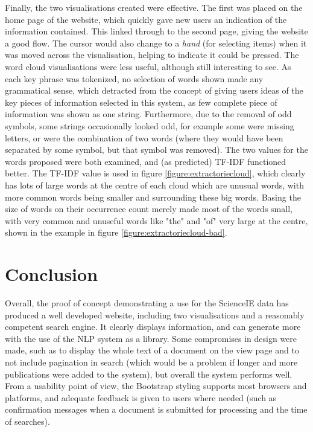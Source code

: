 Finally, the two visualisations created were effective. The first was placed on the home page of the website, which quickly gave new users an indication of the information contained. This linked through to the second page, giving the website a good flow. The cursor would also change to a \textit{hand} (for selecting items) when it was moved across the visualisation, helping to indicate it could be pressed. The word cloud visualisations were less useful, although still interesting to see. As each key phrase was tokenized, no selection of words shown made any grammatical sense, which detracted from the concept of giving users ideas of the key pieces of information selected in this system, as few complete piece of information was shown as one string. Furthermore, due to the removal of odd symbols, some strings occasionally looked odd, for example some were missing letters, or were the combination of two words (where they would have been separated by some symbol, but that symbol was removed). The two values for the words proposed were both examined, and (as predicted) TF-IDF functioned better. The TF-IDF value is used in figure \ref{figure:extractoriecloud}, which clearly has lots of large words at the centre of each cloud which are unusual words, with more common words being smaller and surrounding these big words. Basing the size of words on their occurrence count merely made most of the words small, with very common and unuseful words like "the" and "of" very large at the centre, shown in the example in figure \ref{figure:extractoriecloud-bad}.

\section{Conclusion}
Overall, the proof of concept demonstrating a use for the ScienceIE data has produced a well developed website, including two visualisations and a reasonably competent search engine. It clearly displays information, and can generate more with the use of the NLP system as a library. Some compromises in design were made, such as to display the whole text of a document on the view page and to not include pagination in search (which would be a problem if longer and more publications were added to the system), but overall the system performs well. From a usability point of view, the Bootstrap styling supports most browsers and platforms, and adequate feedback is given to users where needed (such as confirmation messages when a document is submitted for processing and the time of searches).
